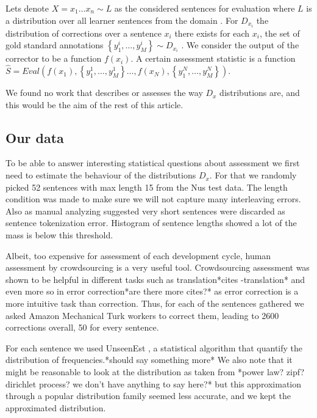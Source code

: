 \documentclass[english]{article}
\begin{document}
Lets denote $X=x_{1}\ldots x_n\sim L$ as the considered
sentences for evaluation where $L$ is a distribution over all learner sentences from the domain . 
For $D_{x_i}$ the distribution of corrections over a sentence $x_i$ there exists for each $x_{i}$, the set of gold standard annotations $\left\{ y_{1}^{i},\ldots,y_{M}^{i}\right\} \sim D_{x_i}$ . We consider the  output of
the corrector to be a function $f\left(x_{i}\right)$. A certain assessment
statistic is a function $\hat{S}=Eval\left(f\left(x_{1}\right),\left\{ y_{1}^{1},\ldots,y_{M}^{1}\right\} \ldots,f\left(x_{N}\right),\left\{ y_{1}^{N},\ldots,y_{M}^{N}\right\} \right)$.

We found no work that describes or assesses the way $D_x$ distributions are, and this would be the aim of the rest of this article. 

\subsection{Our data}
To be able to answer interesting statistical questions about assessment we first need to estimate the behaviour of the distributions $D_x$. For that we randomly picked 52 sentences with max length 15 from the Nus \cite{dahlmeier2013building} test data. The length condition was made to make sure we will not capture many interleaving errors. Also as manual analyzing suggested very short sentences were discarded as sentence tokenization error. Histogram of sentence lengths showed a lot of the mass is below this threshold.

Albeit, too expensive for assessment of each development cycle, human assessment by crowdsourcing is a very useful tool. Crowdsourcing assessment was shown to be helpful in different tasks such as translation{*}cites -translation{*} and even more so in error correction\cite{madnani2011they}{*}are there more cites?{*} as error correction is a more intuitive task than correction. Thus, for each of the sentences gathered we asked Amazon Mechanical Turk workers to correct them, leading to 2600 corrections overall, 50 for every sentence.

For each sentence we used UnseenEst \cite{zou2015quantifying}, a statistical algorithm that quantify the distribution of frequencies.{*}should say something more{*} We also note that it might be reasonable to look at the distribution as taken from {*}power law? zipf? dirichlet process? we don't have anything to say here?{*} but this approximation through a popular distribution family seemed less accurate, and we kept the approximated distribution.
\end{document}
